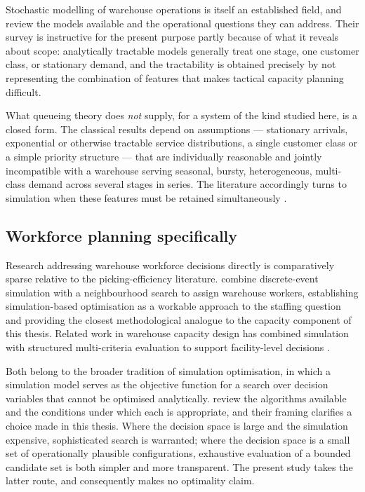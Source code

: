 Stochastic modelling of warehouse operations is itself an established field, and
\citet{gong2011} review the models available and the operational questions they can address.
Their survey is instructive for the present purpose partly because of what it reveals about
scope: analytically tractable models generally treat one stage, one customer class, or
stationary demand, and the tractability is obtained precisely by not representing the
combination of features that makes tactical capacity planning difficult.

What queueing theory does \emph{not} supply, for a system of the kind studied here, is a closed
form. The classical results depend on assumptions --- stationary arrivals, exponential or
otherwise tractable service distributions, a single customer class or a simple priority
structure --- that are individually reasonable and jointly incompatible with a warehouse serving
seasonal, bursty, heterogeneous, multi-class demand across several stages in series. The
literature accordingly turns to simulation when these features must be retained simultaneously
\citep{gu2010,gong2011}.

\subsection{Workforce planning specifically}

Research addressing warehouse workforce decisions directly is comparatively sparse relative to
the picking-efficiency literature. \citet{ganbold2020} combine discrete-event simulation with a
neighbourhood search to assign warehouse workers, establishing simulation-based optimisation as
a workable approach to the staffing question and providing the closest methodological analogue
to the capacity component of this thesis. Related work in warehouse capacity design has combined
simulation with structured multi-criteria evaluation to support facility-level decisions
\citep{sencer2021}.

Both belong to the broader tradition of simulation optimisation, in which a simulation model
serves as the objective function for a search over decision variables that cannot be optimised
analytically. \citet{amaran2016} review the algorithms available and the conditions under which
each is appropriate, and their framing clarifies a choice made in this thesis. Where the
decision space is large and the simulation expensive, sophisticated search is warranted; where
the decision space is a small set of operationally plausible configurations, exhaustive
evaluation of a bounded candidate set is both simpler and more transparent. The present study
takes the latter route, and consequently makes no optimality claim.

